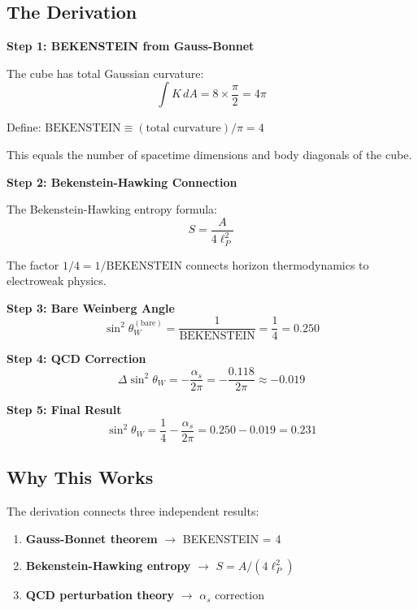\documentclass[12pt,a4paper]{article}
\newcommand{\sinW}{\sin^2\theta_W}
\newcommand{\BEKENSTEIN}{\text{BEKENSTEIN}}
\begin{document}
\subsection{The Derivation}

\textbf{Step 1: BEKENSTEIN from Gauss-Bonnet}

The cube has total Gaussian curvature:
\begin{equation}
\int K \, dA = 8 \times \frac{\pi}{2} = 4\pi
\end{equation}

Define: $\BEKENSTEIN \equiv (\text{total curvature})/\pi = 4$

This equals the number of spacetime dimensions and body diagonals of the cube.

\textbf{Step 2: Bekenstein-Hawking Connection}

The Bekenstein-Hawking entropy formula:
\begin{equation}
S = \frac{A}{4\ell_P^2}
\end{equation}

The factor $1/4 = 1/\BEKENSTEIN$ connects horizon thermodynamics to electroweak physics.

\textbf{Step 3: Bare Weinberg Angle}
\begin{equation}
\sin^2\theta_W^{(\text{bare})} = \frac{1}{\BEKENSTEIN} = \frac{1}{4} = 0.250
\end{equation}

\textbf{Step 4: QCD Correction}
\begin{equation}
\Delta\sinW = -\frac{\alpha_s}{2\pi} = -\frac{0.118}{2\pi} \approx -0.019
\end{equation}

\textbf{Step 5: Final Result}
\begin{equation}
\boxed{\sinW = \frac{1}{4} - \frac{\alpha_s}{2\pi} = 0.250 - 0.019 = 0.231}
\end{equation}

\subsection{Why This Works}

The derivation connects three independent results:
\begin{enumerate}
    \item \textbf{Gauss-Bonnet theorem} $\to$ BEKENSTEIN = 4
    \item \textbf{Bekenstein-Hawking entropy} $\to$ $S = A/(4\ell_P^2)$
    \item \textbf{QCD perturbation theory} $\to$ $\alpha_s$ correction
\end{enumerate}
\end{document}
